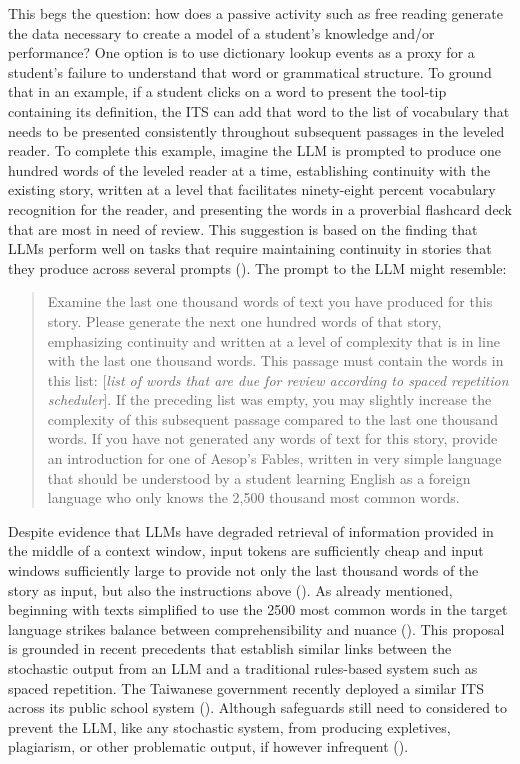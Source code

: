 \documentclass[
	letterpaper, %
]{jdf}
\newcommand{\pcite}[1]{(\cite{#1})}
\begin{document}
This begs the question: how does a passive activity such as free reading generate the data necessary to create a model of a student's knowledge and/or performance? One option is to use dictionary lookup events as a proxy for a student's failure to understand that word or grammatical structure. To ground that in an example, if a student clicks on a word to present the tool-tip containing its definition, the ITS can add that word to the list of vocabulary that needs to be presented consistently throughout subsequent passages in the leveled reader. To complete this example, imagine the LLM is prompted to produce one hundred words of the leveled reader at a time, establishing continuity with the existing story, written at a level that facilitates ninety-eight percent vocabulary recognition for the reader, and presenting the words in a proverbial flashcard deck that are most in need of review. This suggestion is based on the finding that LLMs perform well on tasks that require maintaining continuity in stories that they produce across several prompts \pcite{controllable_story_generation}. The prompt to the LLM might resemble:

\blockquote{Examine the last one thousand words of text you have produced for this story. Please generate the next one hundred words of that story, emphasizing continuity and written at a level of complexity that is in line with the last one thousand words. This passage must contain the words in this list: [\textit{list of words that are due for review according to spaced repetition scheduler}]. If the preceding list was empty, you may slightly increase the complexity of this subsequent passage compared to the last one thousand words. If you have not generated any words of text for this story, provide an introduction for one of Aesop's Fables, written in very simple language that should be understood by a student learning English as a foreign language who only knows the 2,500 thousand most common words.}

Despite evidence that LLMs have degraded retrieval of information provided in the middle of a context window, input tokens are sufficiently cheap and input windows sufficiently large to provide not only the last thousand words of the story as input, but also the instructions above \pcite{liu2023lost}. As already mentioned, beginning with texts simplified to use the 2500 most common words in the target language strikes balance between comprehensibility and nuance \pcite{nation1992vocabulary}. This proposal is grounded in recent precedents that establish similar links between the stochastic output from an LLM and a traditional rules-based system such as spaced repetition. The Taiwanese government recently deployed a similar ITS across its public school system \pcite{taiwan_adaptive_testing}. Although safeguards still need to considered to prevent the LLM, like any stochastic system, from producing expletives, plagiarism, or other problematic output, if however infrequent \pcite{recent_story_generation_review}.
 
\end{document}
